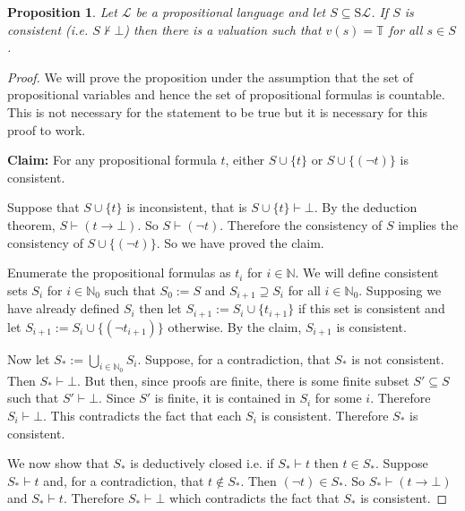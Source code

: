 \documentclass[11pt]{article}
\newcommand{\PF}{\mathrm{S}}
\newcommand{\proves}{\vdash}
\newtheorem{proposition}[theorem]{Proposition}
\newcommand{\mcal}[1]{\mathcal{#1}}
\newcommand{\N}{\mathbb{N}}
\newcommand{\T}{\mathbb{T}}
\begin{document}
\begin{proposition}\label{adequ}
Let $\mcal{L}$ be a propositional language and let $S\subseteq \PF\mcal{L}$. If $S$ is consistent (i.e. $S\not\vdash \bot$) then there is a valuation such that $v(s)=\T$ for all $s\in S$.
\end{proposition}
\begin{proof}
We will prove the proposition under the assumption that the set of propositional variables and hence the set of propositional formulas is countable. This is not necessary for the statement to be true but it is necessary for this proof to work.

\smallskip

\noindent
\textbf{Claim:}
For any propositional formula $t$, either $S\cup \{t\}$ or $S\cup \{(\neg t)\}$ is consistent.

Suppose that $S\cup \{ t\}$ is inconsistent, that is $S\cup\{t\}\vdash \bot$. By the deduction theorem, $S\vdash (t\rightarrow \bot)$. So $S\vdash (\neg t)$. Therefore the consistency of $S$ implies the consistency of $S\cup \{(\neg t)\}$. So we have proved the claim.

\smallskip

Enumerate the propositional formulas as $t_i$ for $i\in \N$. We will define consistent sets $S_i$ for $i\in \N_0$ such that $S_0:=S$ and $S_{i+1}\supseteq S_i$ for all $i\in\N_0$. Supposing we have already defined $S_i$ then let $S_{i+1}:=S_i\cup \{t_{i+1}\}$ if this set is consistent and let $S_{i+1}:=S_i\cup \{(\neg t_{i+1})\}$ otherwise. By the claim, $S_{i+1}$ is consistent.

Now let $S_*:=\bigcup_{i\in\N_0} S_i$. Suppose, for a contradiction, that $S_*$ is not consistent. Then $S_*\proves \bot$. But then, since proofs are finite, there is some finite subset $S'\subseteq S$ such that $S'\proves \bot$. Since $S'$ is finite, it is contained in $S_i$ for some $i$. Therefore $S_i\proves \bot$. This contradicts the fact that each $S_i$ is consistent. Therefore $S_*$ is consistent.


We now show that $S_*$ is deductively closed i.e. if $S_*\proves t$ then $t\in S_*$. Suppose $S_*\proves t$ and, for a contradiction, that $t\notin S_*$. Then $(\neg t)\in S_*$. So $S_*\proves (t\rightarrow \bot)$ and $S_*\proves t$. Therefore $S_*\proves \bot$ which contradicts the fact that $S_*$ is consistent.



\end{proof}
\end{document}
